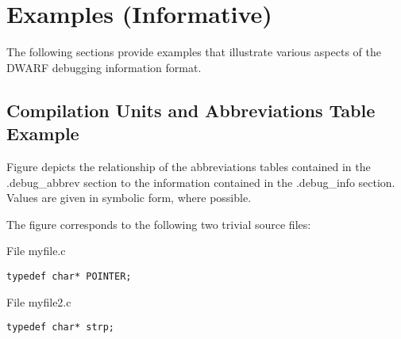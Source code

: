\chapter{Examples (Informative)}
\label{app:examplesinformative}

The following sections provide examples that illustrate
various aspects of the DWARF debugging information format.



\section{ Compilation Units and Abbreviations Table Example}
\label{app:compilationunitsandabbreviationstableexample}


Figure 
depicts the relationship of the abbreviations tables contained
in the .debug\_abbrev section to the information contained in
the .debug\_info section. Values are given in symbolic form,
where possible.

The figure corresponds to the following two trivial source files:

File myfile.c
\begin{lstlisting}
typedef char* POINTER;
\end{lstlisting}
File myfile2.c
\begin{lstlisting}
typedef char* strp;
\end{lstlisting}

